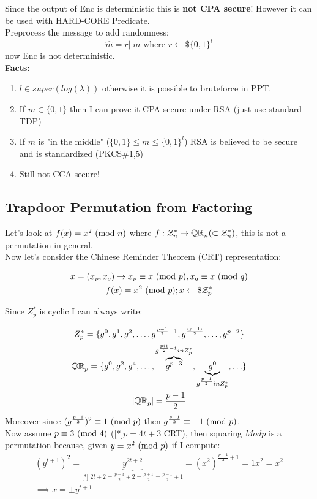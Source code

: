 Since the output of Enc is deterministic this is \textbf{not CPA secure}! However it can be used with HARD-CORE Predicate.\\
Preprocess the message to add randomness:
$$\hat{m}=r||m \text{ where }r\leftarrow\mathdollar\{0,1\}^l$$
now Enc is not deterministic.\\
\textbf{Facts:}
\begin{enumerate}
    \item $l \in super(log(\lambda))$ otherwise it is possible to bruteforce in PPT.
    \item If $m\in\{0,1\}$ then I can prove it CPA secure under RSA (just use standard TDP)
    \item If $m$ is "in the middle" ($\{0,1\} \leq m \leq \{0,1\}^l$) RSA is believed to be secure and is \underline{standardized} (PKCS\#1,5)
    \item Still not CCA secure!
\end{enumerate}



\subsection{Trapdoor Permutation from Factoring}
Let's look at $f(x)=x^2\Mod{n}$ where $f: \Z_n^* \to \QR[n] (\subset \Z_n^*)$, this is not a permutation in general.\\
Now let's consider the Chinese Reminder Theorem (CRT) representation:

    \begin{gather*}
        x=(x_p,x_q) \rightarrow x_p\equiv x\Mod{p} , x_q\equiv x\Mod{q}\\
        f(x)=x^2\Mod{p}; x \from \$ \Z_p^*
    \end{gather*}

Since $Z_p^*$ is cyclic I can always write:

\begin{gather*}
    Z_p^*=\{g^0,g^1,g^2,\ldots,g^{\frac{p-1}{2}-1},g^{\frac{(p-1)}{2}},\ldots,g^{p-2} \}\\
    \QR[p]=\{g^0,g^2,g^4,\ldots,\overbrace{g^{p-3}}^{g^{\frac{pi1}{2}-1} in Z_p^*},\underbrace{g^0}_{g^{\frac{p-1}{2}}in Z_p^*},\ldots\}\\
    |\QR[p]|=\frac{p-1}{2}
\end{gather*}
Moreover since $(g^{\frac{p-1}{2}})^2 \equiv 1 \Mod{p} $ then $g^{\frac{p-1}{2}} \equiv -1 \Mod{p}$.\\
Now assume $p\equiv 3 \Mod{4}$ ([*]$p=4t+3$ CRT), then squaring $Mod{p}$ is a permutation because, given \underline{$y=x^2 \Mod{p}$} if I compute:
\begin{gather*}
    (y^{t+1})^2=\underbrace{y^{2t+2}}_{\text{[*] }2t+2=\frac{p-3}{2}+2=\frac{p+1}{2}=\frac{p-1}{2}+1}=(x^2)^{\frac{p-1}{2}+1}=1x^2=x^2\\
    \implies x=\pm y^{t+1}
\end{gather*}

